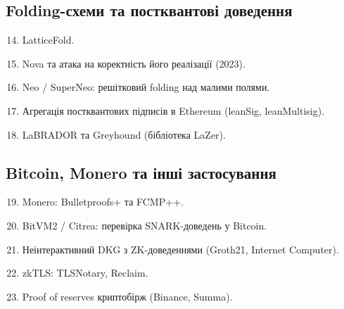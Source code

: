 \documentclass{../../test-template}
\begin{document}
\subsection*{Folding-схеми та постквантові доведення}
\begin{enumerate}
    \setcounter{enumi}{13}
    \item LatticeFold.
    \item Nova та атака на коректність його реалізації (2023).
    \item Neo / SuperNeo: решітковий folding над малими полями.
    \item Агрегація постквантових підписів в Ethereum (leanSig, leanMultisig).
    \item LaBRADOR та Greyhound (бібліотека LaZer).
\end{enumerate}

\subsection*{Bitcoin, Monero та інші застосування}
\begin{enumerate}
    \setcounter{enumi}{18}
    \item Monero: Bulletproofs+ та FCMP++.
    \item BitVM2 / Citrea: перевірка SNARK-доведень у Bitcoin.
    \item Неінтерактивний DKG з ZK-доведеннями (Groth21, Internet Computer).
    \item zkTLS: TLSNotary, Reclaim.
    \item Proof of reserves криптобірж (Binance, Summa).
\end{enumerate}
\end{document}
